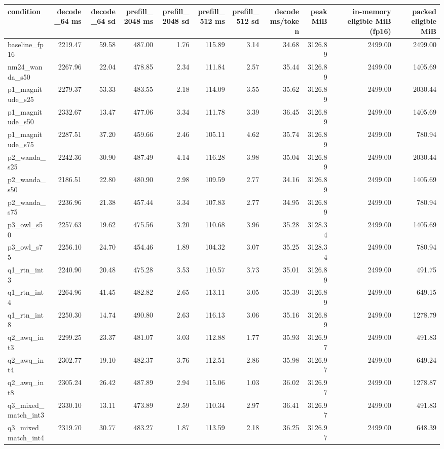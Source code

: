 \begin{tabular}{lrrrrrrrrrr}
\toprule
condition & decode\_64 ms & decode\_64 sd & prefill\_2048 ms & prefill\_2048 sd & prefill\_512 ms & prefill\_512 sd & decode ms/token & peak MiB & in-memory eligible MiB (fp16) & packed eligible MiB \\
\midrule
baseline\_fp16 & 2219.47 & 59.58 & 487.00 & 1.76 & 115.89 & 3.14 & 34.68 & 3126.89 & 2499.00 & 2499.00 \\
nm24\_wanda\_s50 & 2267.96 & 22.04 & 478.85 & 2.34 & 111.84 & 2.57 & 35.44 & 3126.89 & 2499.00 & 1405.69 \\
p1\_magnitude\_s25 & 2279.37 & 53.33 & 483.55 & 2.18 & 114.09 & 3.55 & 35.62 & 3126.89 & 2499.00 & 2030.44 \\
p1\_magnitude\_s50 & 2332.67 & 13.47 & 477.06 & 3.34 & 111.78 & 3.39 & 36.45 & 3126.89 & 2499.00 & 1405.69 \\
p1\_magnitude\_s75 & 2287.51 & 37.20 & 459.66 & 2.46 & 105.11 & 4.62 & 35.74 & 3126.89 & 2499.00 & 780.94 \\
p2\_wanda\_s25 & 2242.36 & 30.90 & 487.49 & 4.14 & 116.28 & 3.98 & 35.04 & 3126.89 & 2499.00 & 2030.44 \\
p2\_wanda\_s50 & 2186.51 & 22.80 & 480.90 & 2.98 & 109.59 & 2.77 & 34.16 & 3126.89 & 2499.00 & 1405.69 \\
p2\_wanda\_s75 & 2236.96 & 21.38 & 457.44 & 3.34 & 107.83 & 2.77 & 34.95 & 3126.89 & 2499.00 & 780.94 \\
p3\_owl\_s50 & 2257.63 & 19.62 & 475.56 & 3.20 & 110.68 & 3.96 & 35.28 & 3128.34 & 2499.00 & 1405.69 \\
p3\_owl\_s75 & 2256.10 & 24.70 & 454.46 & 1.89 & 104.32 & 3.07 & 35.25 & 3128.34 & 2499.00 & 780.94 \\
q1\_rtn\_int3 & 2240.90 & 20.48 & 475.28 & 3.53 & 110.57 & 3.73 & 35.01 & 3126.89 & 2499.00 & 491.75 \\
q1\_rtn\_int4 & 2264.96 & 41.45 & 482.82 & 2.65 & 113.11 & 3.05 & 35.39 & 3126.89 & 2499.00 & 649.15 \\
q1\_rtn\_int8 & 2250.30 & 14.74 & 490.80 & 2.63 & 116.13 & 3.06 & 35.16 & 3126.89 & 2499.00 & 1278.79 \\
q2\_awq\_int3 & 2299.25 & 23.37 & 481.07 & 3.03 & 112.88 & 1.77 & 35.93 & 3126.97 & 2499.00 & 491.83 \\
q2\_awq\_int4 & 2302.77 & 19.10 & 482.37 & 3.76 & 112.51 & 2.86 & 35.98 & 3126.97 & 2499.00 & 649.24 \\
q2\_awq\_int8 & 2305.24 & 26.42 & 487.89 & 2.94 & 115.06 & 1.03 & 36.02 & 3126.97 & 2499.00 & 1278.87 \\
q3\_mixed\_match\_int3 & 2330.10 & 13.11 & 473.89 & 2.59 & 110.34 & 2.97 & 36.41 & 3126.97 & 2499.00 & 491.83 \\
q3\_mixed\_match\_int4 & 2319.70 & 30.77 & 483.27 & 1.87 & 113.59 & 2.18 & 36.25 & 3126.97 & 2499.00 & 648.39 \\
\bottomrule
\end{tabular}
